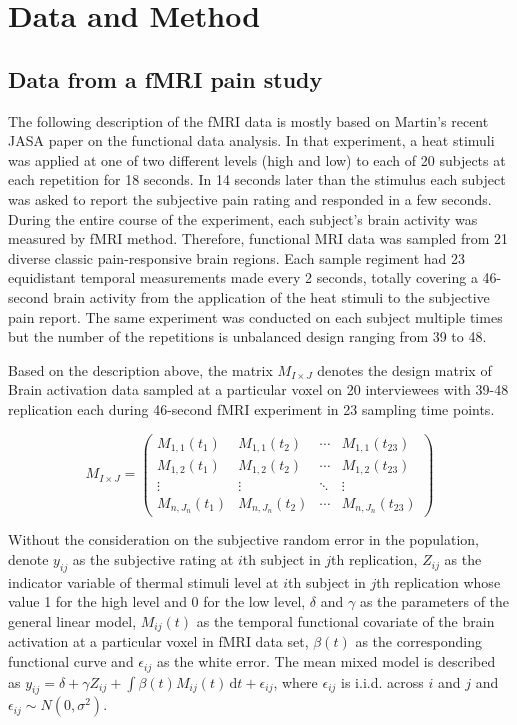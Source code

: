 
\section{Data and Method}
\subsection{Data from a fMRI pain study}
The following description of the fMRI data is mostly based on Martin's recent JASA paper \cite{lindquist2012functional} on the functional data analysis. In that experiment, a heat stimuli was applied at one of two different levels (high and low) to each of 20 subjects at each repetition for 18 seconds. In 14 seconds later than the stimulus each subject was asked to report the subjective pain rating and responded in a few seconds. During the entire course of the experiment, each subject's brain activity was measured by fMRI method. Therefore, functional MRI data was sampled from 21 diverse classic pain-responsive brain regions. Each sample regiment had 23 equidistant temporal measurements made every 2 seconds, totally covering a 46-second brain activity from the application of the heat stimuli to the subjective pain report. The same experiment was conducted on each subject multiple times but the number of the repetitions is unbalanced design ranging from 39 to 48.


Based on the description above, the matrix $M_{I\times J}$ denotes the design matrix of Brain activation data sampled at a particular voxel on 20 interviewees with 39-48 replication each during 46-second fMRI experiment in 23 sampling time points.

$$
M_{I\times J} = 
\begin{pmatrix}
M_{1,1}(t_1) & M_{1,1}(t_2) & \cdots & M_{1,1}(t_{23}) \\
M_{1,2}(t_1) & M_{1,2}(t_2) & \cdots & M_{1,2}(t_{23}) \\
\vdots  & \vdots  & \ddots & \vdots  \\
M_{n,J_n}(t_1) & M_{n,J_n}(t_2) & \cdots & M_{n,J_n}(t_{23})
\end{pmatrix}
$$



Without the consideration on the subjective random error in the population, denote $y_{ij}$ as the subjective rating at $i$th subject in $j$th replication, $Z_{ij}$ as the indicator variable of thermal stimuli level at $i$th subject in $j$th replication whose value 1 for the high level and 0 for the low level, $\delta$ and $\gamma$ as the parameters of the general linear model, $M_{ij}(t)$ as the temporal functional covariate of the brain activation at a particular voxel in fMRI data set, $\beta(t)$ as the corresponding functional curve and $\epsilon_{ij}$ as the white error. The mean mixed model is described as $y_{ij} = \delta + \gamma Z_{ij} + \int \beta(t) M_{ij}(t) \, \mathrm{d}t + \epsilon_{ij}$, where $\epsilon_{ij}$ is i.i.d. across $i$ and $j$ and $\epsilon_{ij} \sim N(0, \sigma^2)$.  

